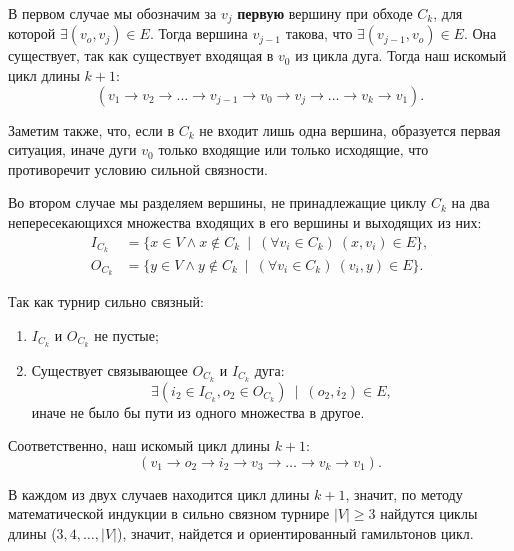 В первом случае мы обозначим за \(v_j\) \textbf{первую} вершину при обходе \(C_k\), для которой \(\exists (v_o, v_j) \in E\). Тогда вершина \(v_{j-1}\) такова, что \(\exists (v_{j-1}, v_o) \in E\). Она существует, так как существует входящая в \(v_0\) из цикла дуга. Тогда наш искомый цикл длины \(k + 1\):
\begin{equation*}
    (v_1 \rightarrow v_2 \rightarrow \ldots \rightarrow v_{j-1} \rightarrow v_0 \rightarrow v_j \rightarrow \ldots \rightarrow v_k \rightarrow v_1).
\end{equation*}

Заметим также, что, если в \(C_k\) не входит лишь одна вершина, образуется первая ситуация, иначе дуги \(v_0\) только входящие или только исходящие, что противоречит условию сильной связности.

Во втором случае мы разделяем вершины, не принадлежащие циклу \(C_k\) на два непересекающихся множества входящих в его вершины и выходящих из них:
\begin{align*}
    I_{C_k} &= \{x \in V \wedge x \notin C_k\:\mid\:(\forall v_i \in C_k)\:(x, v_i) \in E \},\\
    O_{C_k} &= \{y \in V \wedge y \notin C_k\:\mid\:(\forall v_i \in C_k)\:(v_i, y) \in E \}.
\end{align*}

Так как турнир сильно связный:
\begin{enumerate}
    \item \(I_{C_k}\) и \(O_{C_k}\) не пустые;
    
    \item Существует связывающее \(O_{C_k}\) и \(I_{C_k}\) дуга:
    \begin{equation*}
        \exists (i_2 \in I_{C_k}, o_2 \in O_{C_k})\:\mid\:(o_2, i_2) \in E,
    \end{equation*}
    иначе не было бы пути из одного множества в другое.
\end{enumerate}

Соответственно, наш искомый цикл длины \(k + 1\):
\begin{equation*}
    (v_1 \rightarrow o_2 \rightarrow i_2 \rightarrow v_3 \rightarrow \ldots \rightarrow v_k \rightarrow v_1).
\end{equation*}

В каждом из двух случаев находится цикл длины \(k + 1\), значит, по методу математической индукции в сильно связном турнире \(|V| \geqslant 3\) найдутся циклы длины (\(3, 4, \ldots, |V|\)), значит, найдется и ориентированный гамильтонов цикл.
